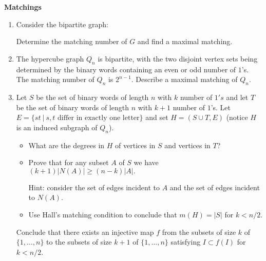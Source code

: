 \documentclass[12pt,
               a4paper,
               article,
               oneside,
               oldfontcommands,
               UKenglish]{memoir}
\begin{document}
\begin{problem}{\bf{Matchings}}
\begin{enumerate}
\item
Consider the bipartite graph:


\begin{center}
\end{center}
Determine the matching number of $G$ and find a maximal matching.


\item The hypercube graph  $Q_n$ is bipartite, with the two disjoint vertex sets being determined by the binary  words containing an even or odd number of $1$'s.
The matching number of $Q_n$ is $2^{n-1}$. Describe a maximal matching of $Q_n$.


 \item
Let  $S$ be the set of binary words of length $n$ with $k$ number of $1's$ and let $T$ be the set of binary words of length $n$ with $k+1$ number of  $1$'s.
Let $E = \{st \ | \ s, t \text{ differ in exactly one letter}  \}$ and set  $H = (S \cup T, E)$ (notice $H$ is an induced subgraph of $Q_n$).

\begin{itemize}
\item What are  the degrees in $H$  of vertices in $S$ and vertices in $T$?

\item Prove that for any subset $A$ of $S$  we have $(k+1) |N(A)|  \geq (n-k)  |A|.$

Hint: consider the set of edges incident to $A$ and the set of edges incident to $N(A)$.

\item Use Hall's matching condition to conclude that $m(H) = |S| $ for  $k <n/2$.
\end{itemize}


Conclude that there exists an injective map $f$ from the subsets of size $k$ of $\{1, \dots, n\}$ to the subsets of size $k+1$ of $\{1, \dots ,n\}$
satisfying $I \subset f(I)$ for $k < n/2$.


\end{enumerate}


\end{problem}
\end{document}
